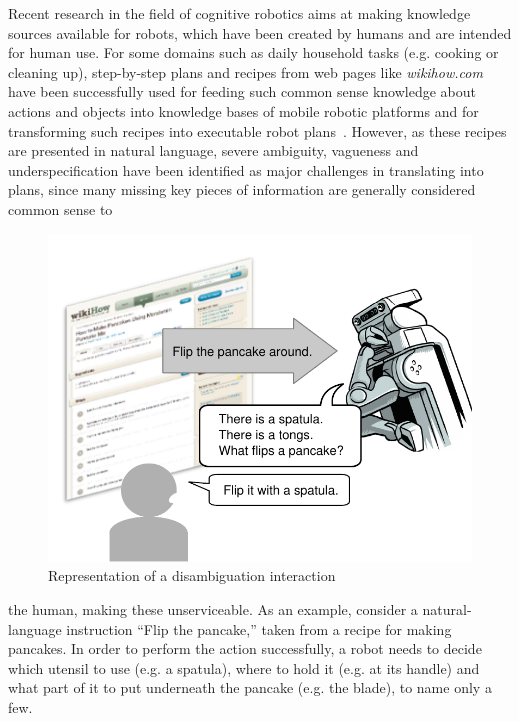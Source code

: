 \documentclass[oribibl]{llncs}
\begin{document}
Recent research in the field of cognitive robotics aims at making 
knowledge sources available for robots, which have been created by 
humans and are intended for human use. For some domains such as 
daily household tasks (e.g. cooking or cleaning up), step-by-step 
plans and recipes from web pages like \textit 
{wikihow.com} have been successfully used for feeding such common 
sense knowledge about actions and objects into knowledge bases of 
mobile robotic platforms and for transforming such recipes into 
executable robot plans~\cite{tenorth10webinstructions}. However, as 
these recipes are presented in natural language, severe ambiguity, 
vagueness and underspecification have been identified as major 
challenges in translating into plans, since many missing 
key pieces of information are generally considered common sense to 
\begin{figure}[t]
\centering
\includegraphics[scale=0.51, trim = 0mm 0mm 0mm 8mm]{human_robot.pdf}
\caption{Representation of a disambiguation interaction}
\label{fig:application}
\end{figure} 
the human, making these unserviceable.
As an example, consider a natural-language instruction ``Flip the 
pancake,'' taken from a recipe for making pancakes. 
In order to perform the action successfully, a robot needs to decide 
which utensil to use (e.g. a spatula), where to hold it (e.g. at its 
handle) and what part of it to put underneath the pancake (e.g. the 
blade), to name only a few.
\end{document}
